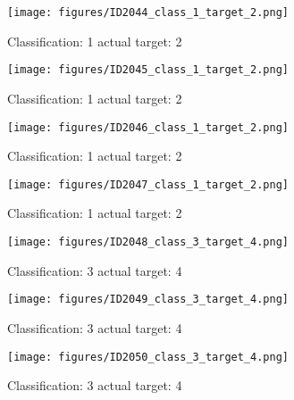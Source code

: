 \begin{figure}[h!]
\begin{center}
\texttt{[image: figures/ID2044\_class\_1\_target\_2.png]}
\end{center}
\caption{ Classification: 1 actual target: 2}
\label{fig:ID2044_class_1_target_2}
\end{figure}
\begin{figure}[h!]
\begin{center}
\texttt{[image: figures/ID2045\_class\_1\_target\_2.png]}
\end{center}
\caption{ Classification: 1 actual target: 2}
\label{fig:ID2045_class_1_target_2}
\end{figure}
\begin{figure}[h!]
\begin{center}
\texttt{[image: figures/ID2046\_class\_1\_target\_2.png]}
\end{center}
\caption{ Classification: 1 actual target: 2}
\label{fig:ID2046_class_1_target_2}
\end{figure}
\begin{figure}[h!]
\begin{center}
\texttt{[image: figures/ID2047\_class\_1\_target\_2.png]}
\end{center}
\caption{ Classification: 1 actual target: 2}
\label{fig:ID2047_class_1_target_2}
\end{figure}
\begin{figure}[h!]
\begin{center}
\texttt{[image: figures/ID2048\_class\_3\_target\_4.png]}
\end{center}
\caption{ Classification: 3 actual target: 4}
\label{fig:ID2048_class_3_target_4}
\end{figure}
\begin{figure}[h!]
\begin{center}
\texttt{[image: figures/ID2049\_class\_3\_target\_4.png]}
\end{center}
\caption{ Classification: 3 actual target: 4}
\label{fig:ID2049_class_3_target_4}
\end{figure}
\begin{figure}[h!]
\begin{center}
\texttt{[image: figures/ID2050\_class\_3\_target\_4.png]}
\end{center}
\caption{ Classification: 3 actual target: 4}
\label{fig:ID2050_class_3_target_4}
\end{figure}
